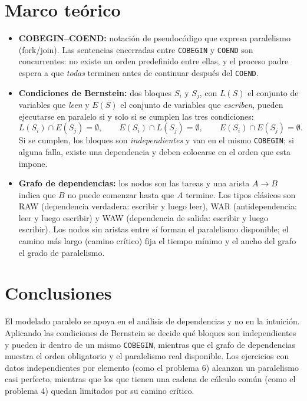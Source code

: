 \documentclass[12pt,letterpaper]{article}
\begin{document}
\section{Marco te\'orico}
\begin{itemize}[leftmargin=1.4cm]
    \item \textbf{COBEGIN--COEND:} notaci\'on de pseudoc\'odigo que expresa
    paralelismo (fork/join). Las sentencias encerradas entre \texttt{COBEGIN} y
    \texttt{COEND} son concurrentes: no existe un orden predefinido entre
    ellas, y el proceso padre espera a que \emph{todas} terminen antes de
    continuar despu\'es del \texttt{COEND}.

    \item \textbf{Condiciones de Bernstein:} dos bloques $S_i$ y $S_j$, con
    $L(S)$ el conjunto de variables que \emph{leen} y $E(S)$ el conjunto de
    variables que \emph{escriben}, pueden ejecutarse en paralelo si y solo si
    se cumplen las tres condiciones:
    \[
        L(S_i) \cap E(S_j) = \emptyset, \qquad
        E(S_i) \cap L(S_j) = \emptyset, \qquad
        E(S_i) \cap E(S_j) = \emptyset.
    \]
    Si se cumplen, los bloques son \emph{independientes} y van en el mismo
    \texttt{COBEGIN}; si alguna falla, existe una dependencia y deben colocarse
    en el orden que esta impone.

    \item \textbf{Grafo de dependencias:} los nodos son las tareas y una arista
    $A \rightarrow B$ indica que $B$ no puede comenzar hasta que $A$ termine.
    Los tipos cl\'asicos son RAW (dependencia verdadera: escribir y luego
    leer), WAR (antidependencia: leer y luego escribir) y WAW (dependencia de
    salida: escribir y luego escribir). Los nodos sin aristas entre s\'i
    forman el paralelismo disponible; el camino m\'as largo (camino cr\'itico)
    fija el tiempo m\'inimo y el ancho del grafo el grado de paralelismo.
\end{itemize}









\section{Conclusiones}
El modelado paralelo se apoya en el an\'alisis de dependencias y no en la
intuici\'on. Aplicando las condiciones de Bernstein se decide qu\'e bloques son
independientes y pueden ir dentro de un mismo \texttt{COBEGIN}, mientras que el
grafo de dependencias muestra el orden obligatorio y el paralelismo real
disponible. Los ejercicios con datos independientes por elemento (como el
problema 6) alcanzan un paralelismo casi perfecto, mientras que los que tienen
una cadena de c\'alculo com\'un (como el problema 4) quedan limitados por su
camino cr\'itico.
\end{document}
